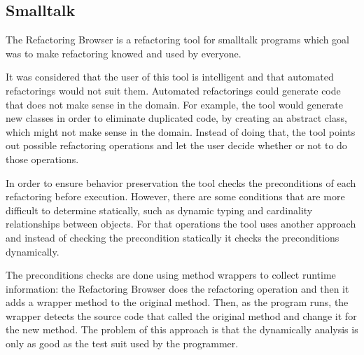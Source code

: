 
\subsection{Smalltalk}%

The Refactoring Browser \cite{roberts1997refactoring} is a refactoring tool for smalltalk programs which goal was to make refactoring knowed and used by everyone.


It was considered that the user of this tool is intelligent and that automated refactorings would not suit them. 
Automated refactorings could generate code that does not make sense in the domain.
For example, the tool would generate new classes in order to eliminate duplicated code, by creating an abstract class, which might not make sense in the domain. Instead of doing that, the tool points out possible refactoring operations and let the user decide whether or not to do those operations.

In order to ensure behavior preservation the tool checks the preconditions of each refactoring before execution. 
However, there are some conditions that are more difficult to determine statically, such as dynamic typing and cardinality relationships between objects. For that operations the tool uses another approach and instead of checking the precondition statically it checks the preconditions dynamically. 

The preconditions checks are done using method wrappers to collect runtime information: the Refactoring Browser does the refactoring operation and then it adds a wrapper method to the original method. Then, as the program runs, the wrapper detects the source code that called the original method and change it for the new method.
The problem of this approach is that the dynamically analysis is only as good as the test suit used by the programmer.


